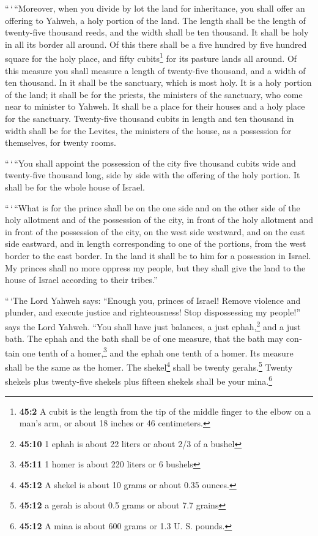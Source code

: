 \begin{paracol}{2}
\begin{otherlanguage}{english}
 ``\,`\,``Moreover, when you divide by lot the land for
inheritance, you shall offer an offering to Yahweh, a holy portion of
the land. The length shall be the length of twenty-five thousand reeds,
and the width shall be ten thousand. It shall be holy in all its border
all around.  Of this there shall be a five hundred by five
hundred square for the holy place, and fifty cubits\footnote{\textbf{45:2}
  A cubit is the length from the tip of the middle finger to the elbow
  on a man's arm, or about 18 inches or 46 centimeters.} for its pasture
lands all around.  Of this measure you shall measure a
length of twenty-five thousand, and a width of ten thousand. In it shall
be the sanctuary, which is most holy.  It is a holy
portion of the land; it shall be for the priests, the ministers of the
sanctuary, who come near to minister to Yahweh. It shall be a place for
their houses and a holy place for the sanctuary. 
Twenty-five thousand cubits in length and ten thousand in width shall be
for the Levites, the ministers of the house, as a possession for
themselves, for twenty rooms.

 ``\,`\,``You shall appoint the possession of the city
five thousand cubits wide and twenty-five thousand long, side by side
with the offering of the holy portion. It shall be for the whole house
of Israel.

 ``\,`\,``What is for the prince shall be on the one side
and on the other side of the holy allotment and of the possession of the
city, in front of the holy allotment and in front of the possession of
the city, on the west side westward, and on the east side eastward, and
in length corresponding to one of the portions, from the west border to
the east border.  In the land it shall be to him for a
possession in Israel. My princes shall no more oppress my people, but
they shall give the land to the house of Israel according to their
tribes.''

 ``\,`The Lord Yahweh says: ``Enough you, princes of
Israel! Remove violence and plunder, and execute justice and
righteousness! Stop dispossessing my people!'' says the Lord Yahweh.
 ``You shall have just balances, a just ephah,\footnote{\textbf{45:10}
  1 ephah is about 22 liters or about 2/3 of a bushel} and a just bath.
 The ephah and the bath shall be of one measure, that the
bath may contain one tenth of a homer,\footnote{\textbf{45:11} 1 homer
  is about 220 liters or 6 bushels} and the ephah one tenth of a homer.
Its measure shall be the same as the homer.  The
shekel\footnote{\textbf{45:12} A shekel is about 10 grams or about 0.35
  ounces.} shall be twenty gerahs.\footnote{\textbf{45:12} a gerah is
  about 0.5 grams or about 7.7 grains} Twenty shekels plus twenty-five
shekels plus fifteen shekels shall be your mina.\footnote{\textbf{45:12}
  A mina is about 600 grams or 1.3 U. S. pounds.}


\end{otherlanguage}
\end{paracol}
